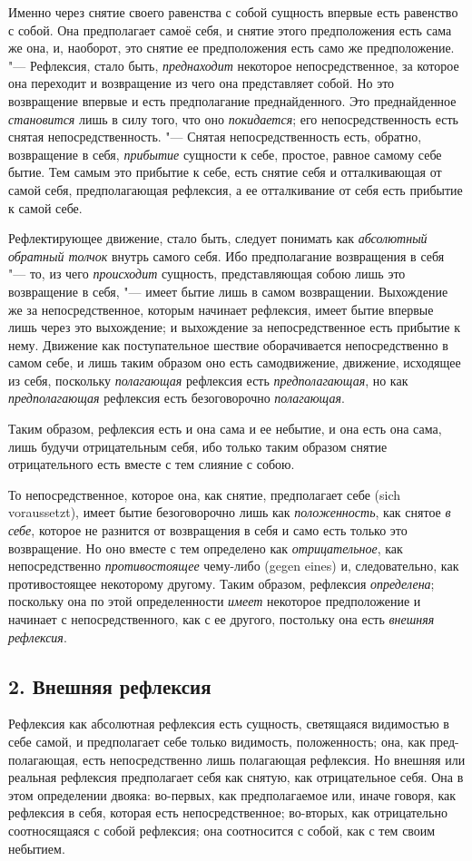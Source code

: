 Именно через снятие своего равенства с собой сущность впервые есть равенство
с собой. Она предполагает самоё себя, и снятие этого предположения есть
сама же она, и, наоборот, это снятие ее предположения есть само же
предположение. "--- Рефлексия, стало быть,
{\em преднаходит} некоторое непосредственное, за
которое она переходит и возвращение из чего она представляет собой. Но это
возвращение впервые и есть предполагание преднайденного. Это преднайденное
{\em становится} лишь в силу того, что оно
{\em покидается}; его непосредственность есть снятая
непосредственность. "--- Снятая непосредственность есть, обратно, возвращение
в себя, {\em прибытие} сущности к себе, простое, равное
самому себе бытие. Тем самым это прибытие к себе, есть снятие себя и
отталкивающая от самой себя, предполагающая рефлексия, а ее отталкивание от
себя есть прибытие к самой себе.

Рефлектирующее движение, стало быть, следует понимать как
{\em абсолютный обратный толчок} внутрь самого себя.
Ибо предполагание возвращения в себя "--- то, из чего
{\em происходит} сущность, представляющая собою лишь
это возвращение в себя, "--- имеет бытие лишь в самом возвращении. Выхождение
же за непосредственное, которым начинает рефлексия, имеет бытие впервые
лишь через это выхождение; и выхождение за непосредственное есть прибытие к
нему. Движение как поступательное шествие оборачивается непосредственно в
самом себе, и лишь таким образом оно есть самодвижение, движение, исходящее
из себя, поскольку {\em полагающая} рефлексия есть
{\em предполагающая}, но как
{\em предполагающая} рефлексия есть безоговорочно
{\em полагающая}.

Таким образом, рефлексия есть и она сама и ее небытие, и она есть она сама,
лишь будучи отрицательным себя, ибо только таким образом снятие
отрицательного есть вместе с тем слияние с собою.

То непосредственное, которое она, как снятие, предполагает себе (sich
voraussetzt), имеет бытие безоговорочно лишь как
{\em положенность}, как снятое
{\em в себе}, которое не разнится от возвращения в себя
и само есть только это возвращение. Но оно вместе с тем определено как
{\em отрицательное}, как непосредственно
{\em противостоящее} чему-либо (gegen eines) и,
следовательно, как противостоящее некоторому другому. Таким образом,
рефлексия {\em определена}; поскольку она по этой
определенности {\em имеет} некоторое предположение и
начинает с непосредственного, как с ее другого, постольку она есть
{\em внешняя рефлексия}.

\subsection[2. Внешняя рефлексия]{2. Внешняя рефлексия}
Рефлексия как абсолютная рефлексия есть
сущность, светящаяся видимостью в себе самой, и предполагает себе только
видимость, положенность; она, как пред-полагающая, есть непосредственно
лишь полагающая рефлексия. Но внешняя или реальная рефлексия предполагает
себя как снятую, как отрицательное себя. Она в этом определении двояка:
во-первых, как предполагаемое или, иначе говоря, как рефлексия в себя,
которая есть непосредственное; во-вторых, как отрицательно соотносящаяся с
собой рефлексия; она соотносится с собой, как с тем своим небытием.

